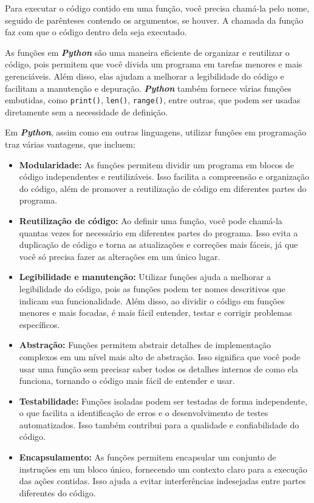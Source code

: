 \documentclass[a4paper, 12pt, onecolumn,singlespacing]{article}
\begin{document}
	Para executar o código contido em uma função, você precisa chamá-la pelo nome, seguido de parênteses contendo os argumentos, se houver. A chamada da função faz com que o código dentro dela seja executado.
	
	As funções em \textbf{\textit{Python}} são uma maneira eficiente de organizar e reutilizar o código, pois permitem que você divida um programa em tarefas menores e mais gerenciáveis. Além disso, elas ajudam a melhorar a legibilidade do código e facilitam a manutenção e depuração. \textbf{\textit{Python}} também fornece várias funções embutidas, como \texttt{print()}, \texttt{len()}, \texttt{range()}, entre outras, que podem ser usadas diretamente sem a necessidade de definição.
	
	Em \textbf{\textit{Python}}, assim como em outras linguagens, utilizar funções em programação traz várias vantagens, que incluem:
	
	\begin{itemize}
		\item \textbf{Modularidade:} As funções permitem dividir um programa em blocos de código independentes e reutilizáveis. Isso facilita a compreensão e organização do código, além de promover a reutilização de código em diferentes partes do programa.
		
		\item \textbf{Reutilização de código:} Ao definir uma função, você pode chamá-la quantas vezes for necessário em diferentes partes do programa. Isso evita a duplicação de código e torna as atualizações e correções mais fáceis, já que você só precisa fazer as alterações em um único lugar.
		
		\item \textbf{Legibilidade e manutenção:} Utilizar funções ajuda a melhorar a legibilidade do código, pois as funções podem ter nomes descritivos que indicam sua funcionalidade. Além disso, ao dividir o código em funções menores e mais focadas, é mais fácil entender, testar e corrigir problemas específicos.
		
		\item \textbf{Abstração:} Funções permitem abstrair detalhes de implementação complexos em um nível mais alto de abstração. Isso significa que você pode usar uma função sem precisar saber todos os detalhes internos de como ela funciona, tornando o código mais fácil de entender e usar.
		
		\item \textbf{Testabilidade:} Funções isoladas podem ser testadas de forma independente, o que facilita a identificação de erros e o desenvolvimento de testes automatizados. Isso também contribui para a qualidade e confiabilidade do código.
		
		\item \textbf{Encapsulamento:} As funções permitem encapsular um conjunto de instruções em um bloco único, fornecendo um contexto claro para a execução das ações contidas. Isso ajuda a evitar interferências indesejadas entre partes diferentes do código.
		
	\end{itemize}
\end{document}
